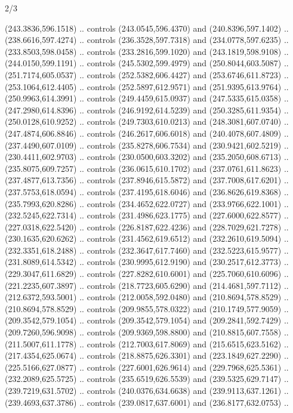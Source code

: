 \begin{flagdescription}{2/3}
\begin{scope}[shift={(0.5\flaglength,0.5)},scale=\flagwidth/545]
\begin{scope}[y=0.80pt, x=0.80pt, yscale=-1,shift={(-297,-430)}]
\begin{scope}[shift={(28.51887,-25.61095)}]
  (243.3836,596.1518) .. controls (243.0545,596.4370) and (240.8396,597.1402) ..
  (238.6616,597.4274) .. controls (236.3528,597.7318) and (234.0778,597.6235) ..
  (233.8503,598.0458) .. controls (233.2816,599.1020) and (243.1819,598.9108) ..
  (244.0150,599.1191) .. controls (245.5302,599.4979) and (250.8044,603.5087) ..
  (251.7174,605.0537) .. controls (252.5382,606.4427) and (253.6746,611.8723) ..
  (253.1064,612.4405) .. controls (252.5897,612.9571) and (251.9395,613.9764) ..
  (250.9963,614.3991) .. controls (249.4459,615.0937) and (247.5335,615.0358) ..
  (247.2980,614.8396) .. controls (246.9192,614.5239) and (250.3285,611.9354) ..
  (250.0128,610.9252) .. controls (249.7303,610.0213) and (248.3081,607.0740) ..
  (247.4874,606.8846) .. controls (246.2617,606.6018) and (240.4078,607.4809) ..
  (237.4490,607.0109) .. controls (235.8278,606.7534) and (230.9421,602.5219) ..
  (230.4411,602.9703) .. controls (230.0500,603.3202) and (235.2050,608.6713) ..
  (235.8075,609.7257) .. controls (236.0615,610.1702) and (237.0761,611.8623) ..
  (237.4877,613.7356) .. controls (237.8946,615.5872) and (237.7008,617.6201) ..
  (237.5753,618.0594) .. controls (237.4195,618.6046) and (236.8626,619.8368) ..
  (235.7993,620.8286) .. controls (234.4652,622.0727) and (233.9766,622.1001) ..
  (232.5245,622.7314) .. controls (231.4986,623.1775) and (227.6000,622.8577) ..
  (227.0318,622.5420) .. controls (226.8187,622.4236) and (228.7029,621.7278) ..
  (230.1635,620.6262) .. controls (231.4562,619.6512) and (232.2610,619.5094) ..
  (232.3351,618.2488) .. controls (232.3647,617.7460) and (232.5223,615.9577) ..
  (231.8089,614.5342) .. controls (230.9995,612.9190) and (230.2517,612.3773) ..
  (229.3047,611.6829) .. controls (227.8282,610.6001) and (225.7060,610.6096) ..
  (221.2235,607.3897) .. controls (218.7723,605.6290) and (214.4681,597.7112) ..
  (212.6372,593.5001) .. controls (212.0058,592.0480) and (210.8694,578.8529) ..
  (210.8694,578.8529) .. controls (209.9855,578.0322) and (210.1749,577.9059) ..
  (209.3542,579.1054) .. controls (209.3542,579.1054) and (209.2841,592.7429) ..
  (209.7260,596.9098) .. controls (209.9369,598.8800) and (210.8815,607.7558) ..
  (211.5007,611.1778) .. controls (212.7003,617.8069) and (215.6515,623.5162) ..
  (217.4354,625.0674) .. controls (218.8875,626.3301) and (223.1849,627.2290) ..
  (225.5166,627.0877) .. controls (227.6001,626.9614) and (229.7968,625.5361) ..
  (232.2089,625.5725) .. controls (235.6519,626.5539) and (239.5325,629.7147) ..
  (239.7219,631.5702) .. controls (240.0376,634.6638) and (239.9113,637.1261) ..
  (239.4693,637.3786) .. controls (239.0817,637.6001) and (236.8177,632.0753) ..

\end{scope}
\end{scope}
\end{scope}
\end{flagdescription}
